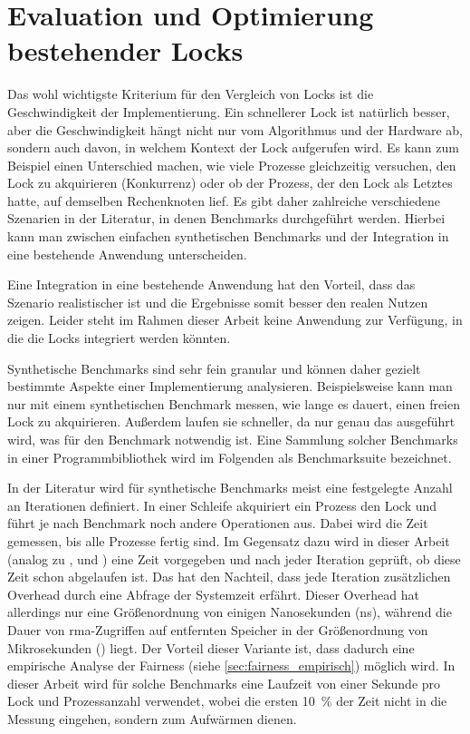 \chapter{Evaluation und Optimierung bestehender Locks}
\label{ch:benchmarks}

Das wohl wichtigste Kriterium für den Vergleich von Locks
ist die Geschwindigkeit der Implementierung.
Ein schnellerer Lock ist natürlich besser,
aber die Geschwindigkeit hängt nicht nur vom Algorithmus und der Hardware ab,
sondern auch davon,
in welchem Kontext der Lock aufgerufen wird.
Es kann zum Beispiel einen Unterschied machen,
wie viele Prozesse gleichzeitig versuchen,
den Lock zu akquirieren (\gls{Konkurrenz})
oder ob der Prozess,
der den Lock als Letztes hatte,
auf demselben Rechenknoten lief.
Es gibt daher zahlreiche verschiedene Szenarien in der Literatur,
in denen Benchmarks durchgeführt werden.
Hierbei kann man zwischen einfachen synthetischen Benchmarks
und der Integration in eine bestehende Anwendung unterscheiden.

Eine Integration in eine bestehende Anwendung hat den Vorteil,
dass das Szenario realistischer ist
und die Ergebnisse somit besser den realen Nutzen zeigen.
Leider steht im Rahmen dieser Arbeit keine Anwendung zur Verfügung,
in die die Locks integriert werden könnten.

Synthetische Benchmarks sind sehr fein granular
und können daher gezielt bestimmte Aspekte einer Implementierung analysieren.
Beispielsweise kann man nur mit einem synthetischen Benchmark messen,
wie lange es dauert,
einen freien Lock zu akquirieren.
Außerdem laufen sie schneller,
da nur genau das ausgeführt wird,
was für den Benchmark notwendig ist.
Eine Sammlung solcher Benchmarks
in einer Programmbibliothek
wird im Folgenden als Benchmarksuite bezeichnet.

In der Literatur \cite{RH-Lock} \cite{HCLH-Lock} \cite{FC-MCS-Lock} \cite{RCL} \cite{SANL} \cite{RMA-RW}
wird für synthetische Benchmarks meist eine festgelegte Anzahl an Iterationen definiert.
In einer Schleife akquiriert ein Prozess den Lock
und führt je nach Benchmark noch andere Operationen aus.
Dabei wird die Zeit gemessen,
bis alle Prozesse fertig sind.
Im Gegensatz dazu wird in dieser Arbeit (analog zu \cite{Cohort-Lock}, \cite{CNA-Lock} und \cite{Shfl-Lock}) eine Zeit vorgegeben
und nach jeder Iteration geprüft,
ob diese Zeit schon abgelaufen ist.
Das hat den Nachteil,
dass jede Iteration zusätzlichen Overhead durch eine Abfrage der Systemzeit erfährt.
Dieser Overhead hat allerdings nur eine Größenordnung von einigen Nanosekunden (ns),
während die Dauer von \gls{rma}-Zugriffen auf entfernten Speicher in der Größenordnung von Mikrosekunden () liegt.
Der Vorteil dieser Variante ist,
dass dadurch eine empirische Analyse der Fairness (siehe \autoref{sec:fairness_empirisch}) möglich wird.
In dieser Arbeit wird für solche Benchmarks eine Laufzeit von einer Sekunde pro Lock und Prozessanzahl verwendet,
wobei die ersten 10~\% der Zeit nicht in die Messung eingehen,
sondern zum Aufwärmen dienen.

